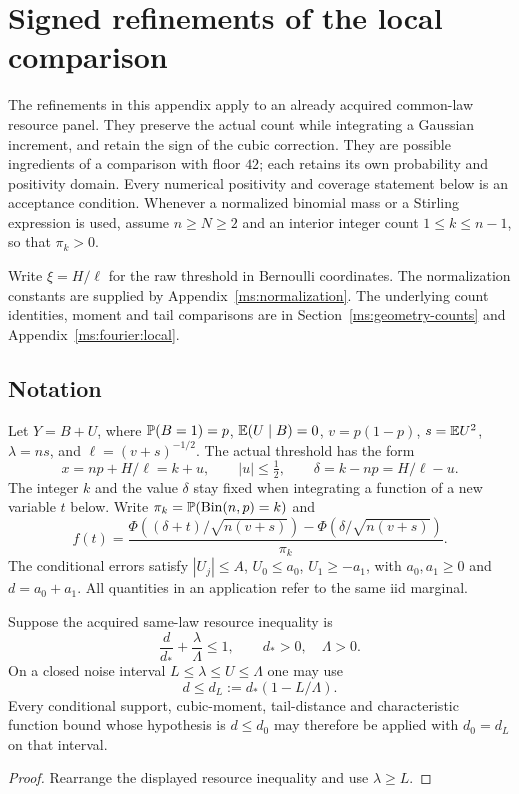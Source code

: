 \section{Signed refinements of the local comparison}\label{ms:local42-refinements}
The refinements in this appendix apply to an already acquired common-law
resource panel. They preserve the actual count while integrating a Gaussian
increment, and retain the sign of the cubic correction. They are possible ingredients of a comparison with floor $42$; each
retains its own probability and positivity domain. Every numerical positivity and coverage statement
below is an acceptance condition. Whenever a normalized binomial mass or
a Stirling expression is used, assume $n\ge N\ge2$ and an interior
integer count $1\le k\le n-1$, so that $\pi_k>0$.

Write $\xi=H/\ell$ for the raw threshold in Bernoulli coordinates. The normalization constants are supplied by
Appendix~\ref{ms:normalization}. The underlying count identities, moment
and tail comparisons are in Section~\ref{ms:geometry-counts} and
Appendix~\ref{ms:fourier:local}.

\subsection{Notation}
Let $Y=B+U$, where $\mathbb P(B=1)=p$, $\mathbb E(U\mid B)=0$,
$v=p(1-p)$, $s=\mathbb E U^2$, $\lambda=ns$, and
$\ell=(v+s)^{-1/2}$. The actual threshold has the form
\[
 x=np+H/\ell=k+u,\qquad |u|\le\tfrac12,
 \qquad \delta=k-np=H/\ell-u.
\]
The integer $k$ and the value $\delta$ stay fixed when integrating a function
of a new variable $t$ below. Write $\pi_k=\mathbb P(\operatorname{Bin}(n,p)=k)$ and
\[
 f(t)=\frac{\Phi((\delta+t)/\sqrt{n(v+s)})-
                   \Phi(\delta/\sqrt{n(v+s)})}{\pi_k}.
\]
The conditional errors satisfy $|U_j|\le A$, $U_0\le a_0$,
$U_1\ge-a_1$, with $a_0,a_1\ge0$ and $d=a_0+a_1$.
All quantities in an application refer to the same iid marginal.

\begin{lemma}\label{ms:local42:lem:joint}
Suppose the acquired same-law resource inequality is
\[
        \frac d{d_*}+\frac\lambda\Lambda\le1,
        \qquad d_*>0,\quad\Lambda>0.
\]
On a closed noise interval $L\le\lambda\le U\le\Lambda$ one may use
\[
                d\le d_L:=d_*(1-L/\Lambda).
\]
Every conditional support, cubic-moment, tail-distance and characteristic
function bound whose hypothesis is $d\le d_0$ may therefore be applied with
$d_0=d_L$ on that interval.
\end{lemma}
\begin{proof}
Rearrange the displayed resource inequality and use $\lambda\ge L$.
\end{proof}

